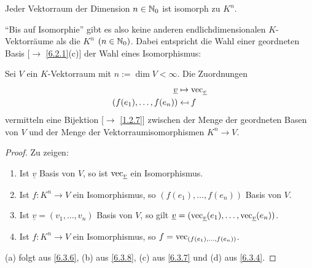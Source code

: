 \documentclass[../../main.tex]{subfiles}
\begin{document}
\begin{kor}\label{6.3.11}
Jeder Vektorraum der Dimension $n\in \mathbb N_0$ ist isomorph zu $K^n$.
\end{kor}

\begin{bem}\label{6.3.12}
"`Bis auf Isomorphie"' gibt es also keine anderen endlichdimensionalen $K$-Vektorräume als die $K^n$ $(n\in \mathbb N_0)$. Dabei entspricht die Wahl einer geordneten Basis [$\to$ \ref{6.2.1}(c)] der Wahl eines Isomorphismus:
\end{bem}

\begin{sat}\label{6.3.13}
Sei $V$ ein $K$-Vektorraum mit $n:=\dim V <\infty$. Die Zuordnungen
\begin{align*}
\underline{v} & \mapsto \operatorname{vec}_{\underline{v}}\\
(f(e_1),\ldots,f(e_n)) & \mapsfrom f
\end{align*}
vermitteln eine Bijektion {\rm[$\to$ \ref{1.2.7}]} zwischen der Menge der geordneten Basen von $V$ und der Menge der Vektorraumisomorphismen $K^n\to V$.
\end{sat}
\begin{proof}
Zu zeigen:
\begin{enumerate}[\normalfont(a)]
\item Ist $\underline{v}$ Basis von $V$, so ist $\operatorname{vec}_{\underline{v}}$ ein Isomorphismus.
\item Ist $f:K^n\to V$ ein Isomorphismus, so $(f(e_1),\ldots,f(e_n))$ Basis von $V$.
\item Ist $\underline{v} = (v_1,\ldots,v_n)$ Basis von $V$, so gilt $\underline{v} = (\operatorname{vec}_{\underline{v}}(e_1),\ldots,\operatorname{vec}_{\underline{v}}(e_n))$.
\item Ist $f:K^n\to V$ ein Isomorphismus, so $f=\operatorname{vec}_{(f(e_1),\ldots,f(e_n))}$.
\end{enumerate}
(a) folgt aus \ref{6.3.6}, (b) aus \ref{6.3.8}, (c) aus \ref{6.3.7} und (d) aus \ref{6.3.4}.
\end{proof}

\end{document}
